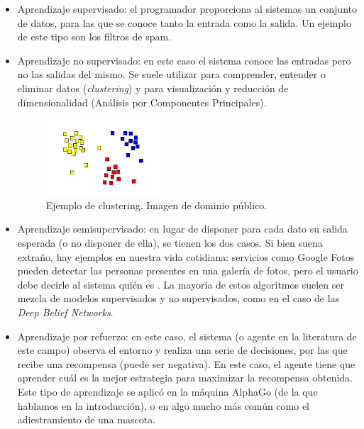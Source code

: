 \documentclass[../main.tex]{subfiles}
\begin{document}
\begin{itemize}
    \item Aprendizaje supervisado: el programador proporciona al sistemas un conjunto de datos, para las que se conoce tanto la entrada como la salida. Un ejemplo de este tipo son los filtros de spam.
    
    \item Aprendizaje no supervisado: en este caso el sistema conoce las entradas pero no las salidas del mismo. Se suele utilizar para comprender, entender o eliminar datos (\textit{clustering}) y para visualización y reducción de dimensionalidad (Análisis por Componentes Principales).
    
    \begin{figure}[h]
        \centering
        \includegraphics[width=0.4\textwidth]{imagenes/Clustering.png}
        \caption[Ejemplo de clustering.]{Ejemplo de clustering. Imagen de dominio público.}
        \label{fig:ejemplo_clustering}
    \end{figure}
    
    \item Aprendizaje semisupervisado: en lugar de disponer para cada dato su salida esperada (o no disponer de ella), se tienen los dos casos. Si bien suena extraño, hay ejemplos en nuestra vida cotidiana: servicios como Google Fotos pueden detectar las personas presentes en una galería de fotos, pero el usuario debe decirle al sistema quién es \cite{Geron2019}. La mayoría de estos algoritmos suelen ser mezcla de modelos supervisados y no supervisados, como en el caso de las \textit{Deep Belief Networks}.
    
    \item Aprendizaje por refuerzo: en este caso, el sistema (o agente en la literatura de este campo) observa el entorno y realiza una serie de decisiones, por las que recibe una recompensa (puede ser negativa). En este caso, el agente tiene que aprender cuál es la mejor estrategia para maximizar la recompensa obtenida. Este tipo de aprendizaje se aplicó en la máquina AlphaGo (de la que hablamos en la introducción), o en algo mucho más común como el adiestramiento de una mascota. 
    
\end{itemize}
\end{document}
